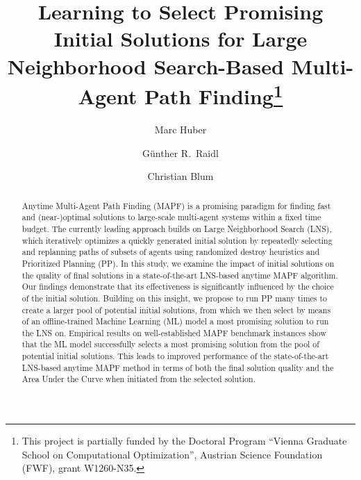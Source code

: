 \documentclass[runningheads]{llncs}
\begin{document}
%
\title{Learning to Select Promising Initial Solutions for Large Neighborhood Search-Based Multi-Agent Path Finding\thanks{This project is partially funded by the Doctoral Program ``Vienna Graduate School on Computational Optimization'', Austrian Science Foundation (FWF), grant W1260-N35.}}
%
%
\author{Marc Huber \and
Günther R.\ Raidl  \and
Christian Blum}
%
%
%
\maketitle              %
%
\begin{abstract}

Anytime Multi-Agent Path Finding (MAPF) is a promising paradigm for finding fast and (near-)optimal solutions to large-scale multi-agent systems within a fixed time budget. The currently leading approach builds on Large Neighborhood Search (LNS), which iteratively optimizes a quickly generated initial solution by repeatedly selecting and replanning paths of subsets of agents using randomized destroy heuristics and Prioritized Planning (PP). In this study, we examine the impact of initial solutions on the quality of final solutions in a state-of-the-art LNS-based anytime MAPF algorithm. Our findings demonstrate that its effectiveness is significantly influenced by the choice of the initial solution. Building on this insight, we propose to run PP many times to create a larger pool of potential initial solutions, from which we then select by means of an offline-trained Machine Learning (ML) model a most promising solution to run the LNS on. Empirical results on well-established MAPF benchmark instances show that the ML model successfully selects a most promising solution from the pool of potential initial solutions. This leads to improved performance of the state-of-the-art LNS-based anytime MAPF method in terms of both the final solution quality and the Area Under the Curve when initiated from the selected solution.

\end{abstract}
%
%
\setcounter{footnote}{0}
\end{document}
